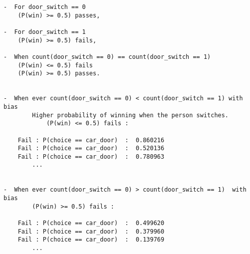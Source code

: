 \documentclass{article}
\begin{document}
\begin{verbatim}
-  For door_switch == 0
	(P(win) >= 0.5) passes,

-  For door_switch == 1 
	(P(win) >= 0.5) fails, 

-  When count(door_switch == 0) == count(door_switch == 1) 
	(P(win) <= 0.5) fails 
	(P(win) >= 0.5) passes.


-  When ever count(door_switch == 0) < count(door_switch == 1) with bias 
		Higher probability of winning when the person switches.
			(P(win) <= 0.5) fails : 

	Fail : P(choice == car_door)  :  0.860216  
	Fail : P(choice == car_door)  :  0.520136  
	Fail : P(choice == car_door)  :  0.780963   
		...


-  When ever count(door_switch == 0) > count(door_switch == 1)  with bias
		(P(win) >= 0.5) fails : 

	Fail : P(choice == car_door)  :  0.499620   
	Fail : P(choice == car_door)  :  0.379960  
	Fail : P(choice == car_door)  :  0.139769   
		...
\end{verbatim}
\end{document}
